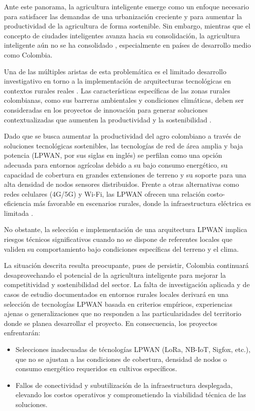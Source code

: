 Ante este panorama, la agricultura inteligente emerge como un enfoque  necesario
para satisfacer las demandas de una urbanización creciente y  para  aumentar  la
productividad de la agricultura de forma sostenible. Sin embargo,  mientras  que
el  concepto  de  ciudades  inteligentes  avanza  hacia  su  consolidación,   la
agricultura      inteligente      aún      no      se       ha       consolidado
\parencite{alabdali2023influential}, especialmente en países de desarrollo medio
como Colombia.

Una de las múltiples aristas de esta  problemática  es  el  limitado  desarrollo
investigativo en torno a la  implementación  de  arquitecturas  tecnológicas  en
contextos   rurales   reales   \parencite{cambra2022re}.   Las   características
específicas de las zonas rurales colombianas, como sus  barreras  ambientales  y
condiciones climáticas, deben ser consideradas en los  proyectos  de  innovación
para generar soluciones contextualizadas que  aumenten  la  productividad  y  la
sostenibilidad \parencite{liu2024personalized}.

Dado que se busca aumentar la productividad del  agro  colombiano  a  través  de
soluciones tecnológicas sostenibles, las tecnologías de red  de  área  amplia  y
baja potencia (LPWAN, por sus siglas en inglés)  se  perfilan  como  una  opción
adecuada para entornos  agrícolas  debido  a  su  bajo  consumo  energético,  su
capacidad de cobertura en grandes extensiones de terreno y su soporte  para  una
alta densidad de nodos sensores distribuidos. Frente a otras  alternativas  como
redes celulares (4G/5G) y Wi-Fi, las LPWAN ofrecen una relación costo-eficiencia
más favorable en escenarios  rurales,  donde  la  infraestructura  eléctrica  es
limitada \parencite{chilamkurthy2022low}.

No obstante, la selección e implementación de  una  arquitectura  LPWAN  implica
riesgos técnicos significativos cuando no se dispone de referentes  locales  que
validen su comportamiento bajo condiciones específicas del terreno y el clima.

La  situación  descrita  resulta  preocupante,  pues  de   persistir,   Colombia
continuará desaprovechando el  potencial  de  la  agricultura  inteligente  para
mejorar la competitividad y sostenibilidad del sector. La falta de investigación
aplicada y de casos de estudio documentados en entornos rurales locales derivará
en  una  selección  de  tecnologías  LPWAN  basada   en   criterios   empíricos,
experiencias ajenas o generalizaciones que no responden a  las  particularidades
del territorio donde se planea desarrollar el  proyecto.  En  consecuencia,  los
proyectos enfrentarán: \begin{itemize}
      \item Selecciones inadecuadas de técnologías LPWAN (LoRa, NB-IoT, Sigfox,
            etc.), que no se ajustan a las condiciones de cobertura, densidad de
            nodos o consumo energético requeridos en cultivos específicos.
      \item Fallos de conectividad y subutilización de la infraestructura
            desplegada, elevando  los  costos  operativos  y  comprometiendo  la
            viabilidad técnica de las soluciones.
\end{itemize}

